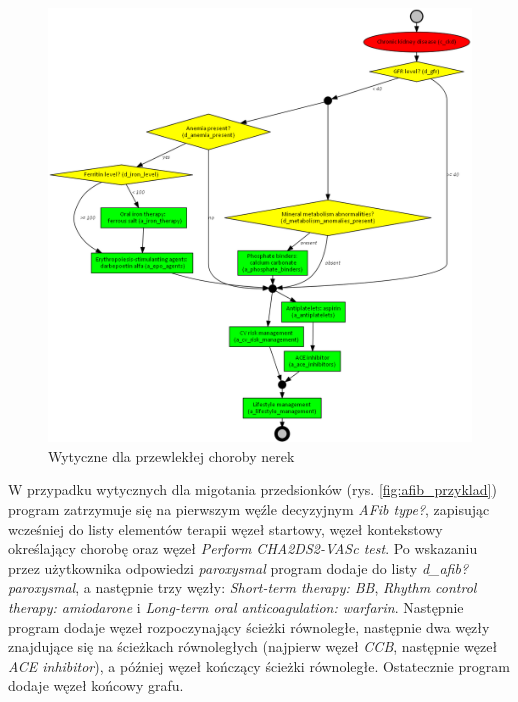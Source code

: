 \begin{figure}[H]
\centering
\includegraphics[scale=0.4]{img/ckd-simplified-ver-5_przyklad.png}
\caption{Wytyczne dla przewlekłej choroby nerek}
\label{fig:ckd_przyklad}
\end{figure}

W przypadku wytycznych dla migotania przedsionków (rys. \ref{fig:afib_przyklad}) program zatrzymuje się na pierwszym węźle decyzyjnym \textit{AFib type?}, zapisując wcześniej do listy elementów terapii węzeł startowy, węzeł kontekstowy określający chorobę oraz węzeł \textit{Perform CHA2DS2-VASc test}. Po wskazaniu przez użytkownika odpowiedzi \textit{paroxysmal} program dodaje do listy \textit{d\_afib?paroxysmal}, a następnie trzy węzły: \textit{Short-term therapy: BB}, \textit{Rhythm control therapy: amiodarone} i \textit{Long-term oral anticoagulation: warfarin}. Następnie program dodaje węzeł rozpoczynający ścieżki równoległe, następnie dwa węzły znajdujące się na ścieżkach równoległych (najpierw węzeł \textit{CCB}, następnie węzeł \textit{ACE inhibitor}), a później węzeł kończący ścieżki równoległe. Ostatecznie program dodaje węzeł końcowy grafu. 

